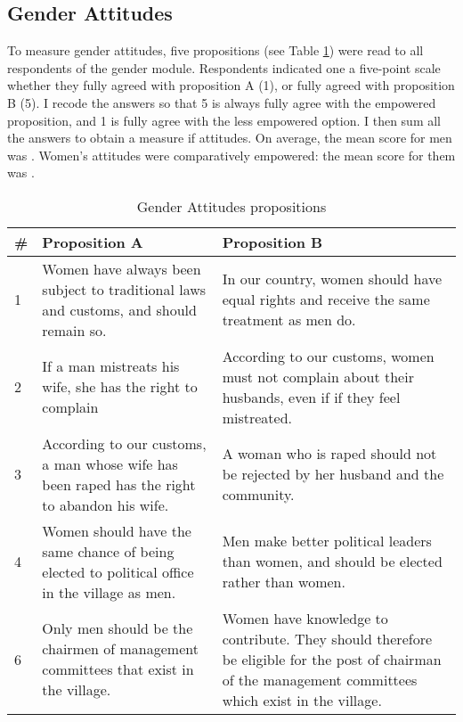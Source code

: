 \documentclass[10pt,a4paper,abstract=on]{scrartcl} %
\begin{document}
\subsection*{Gender Attitudes}
 To measure gender attitudes, five propositions (see Table \ref{tab:genderatt}) were read to all respondents of the gender module. Respondents indicated one a five-point scale whether they fully agreed with proposition A (1), or fully agreed with proposition B (5). I recode the answers so that 5 is always fully agree with the empowered proposition, and 1 is fully agree with the less empowered option. I then sum all the answers to obtain a measure if attitudes. On average, the mean score for men was  . Women's attitudes were comparatively empowered: the mean score for them was .

\begin{table}[htb]
\centering
\caption{Gender Attitudes propositions}
\label{tab:genderatt}
\begin{tabularx}{\textwidth}{l X X}
\toprule
\# & Proposition A & Proposition B \\
\hline
1 & Women have always been subject to traditional laws and customs, and should remain so. &	In our country, women should have equal rights and receive the same treatment as men do. \\
2 & If a man mistreats his wife, she has the right to complain &	According to our customs, women must not complain about their husbands, even if if they feel mistreated. \\
3 & According to our customs, a man whose wife has been raped has the right to abandon his wife. &	A woman who is raped should not be rejected by her husband and the community. \\
4 & Women should have the same chance of being elected to political office in the village as men. & 	 Men make better political leaders  than women, and should be elected rather than women. \\
6 & Only men should be the chairmen of management committees that exist in the village. &	Women have knowledge to contribute. They should therefore be eligible for the post of chairman of the management committees which exist in the village. \\
\bottomrule
\end{tabularx}
\end{table}




\end{document}
